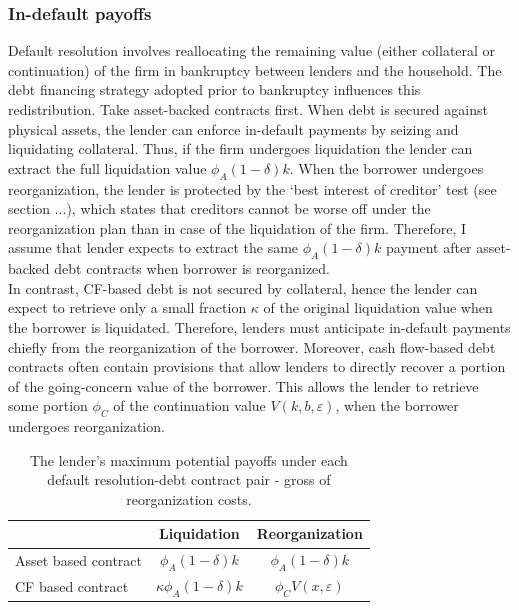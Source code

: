 \documentclass[12pt]{article}
\begin{document}
\subsubsection{In-default payoffs}
Default resolution involves reallocating the remaining value (either collateral or continuation) of the firm in bankruptcy between lenders and the household. The debt financing strategy adopted prior to bankruptcy influences this redistribution.
Take asset-backed contracts first. When debt is secured against physical assets, the lender can enforce in-default payments by seizing and liquidating collateral. Thus, if the firm undergoes liquidation the lender can extract the full liquidation value $\phi_A (1-\delta) k$. When the borrower undergoes reorganization, the lender is protected by the `best interest of creditor' test (see section ...), which states that creditors cannot be worse off under the reorganization plan  than in case of the liquidation of the firm. Therefore, I assume that lender expects to extract the same $\phi_A (1-\delta) k$ payment after asset-backed debt contracts when borrower is reorganized. \vspace{3mm} \\
In contrast, CF-based debt is not secured by collateral, hence the lender can expect to retrieve only a small fraction $\kappa$ of the original liquidation value when the borrower is liquidated. Therefore, lenders must anticipate in-default payments chiefly from the reorganization of the borrower. Moreover, cash flow-based debt contracts often contain provisions that allow lenders to directly recover a portion of the going-concern value of the borrower. This allows the lender to retrieve some portion $\phi_C$ of the continuation value $V(k,b,\varepsilon)$, when the borrower undergoes reorganization. \\
\begin{table}[h!]
    \centering
    \begin{tabular}{l|cc}
        & Liquidation  & Reorganization \\  
       \midrule
      Asset based contract & $ \phi_A (1-\delta) k$  &  $ \phi_A (1-\delta) k$ \\
      CF based contract & $ \kappa \phi_A (1-\delta) k$ & $ \phi_C V(x,\varepsilon)$ \\ 
     \bottomrule
     \end{tabular}
    \caption{\small The lender's maximum potential payoffs under each default resolution-debt contract pair - gross of reorganization costs.} 
    \label{tab:lender payoffs}
\end{table}
\end{document}
